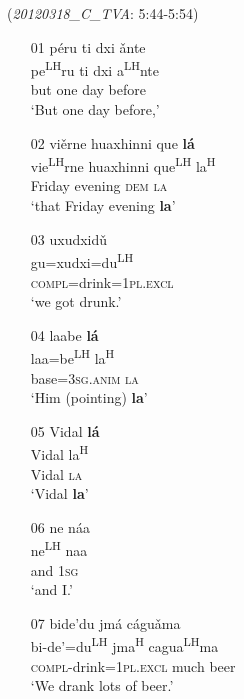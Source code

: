 \ea\label{list} (\textit{20120318{\_}C{\_}TVA}: 5:44-5:54)
\begin{itemize}
\item[01]
\glll p\'{e}ru ti dxi \v{a}nte \\
pe\textsuperscript{LH}ru ti dxi a\textsuperscript{LH}nte \\
but one day before \\
\glt  `But one day before,'


\item[02]
\glll vi\v{e}rne huaxhinni que \textbf{l\'{a}} \\
vie\textsuperscript{LH}rne huaxhinni que\textsuperscript{LH} la\textsuperscript{H} \\
Friday evening \textsc{dem} \textsc{la} \\
\glt  `that Friday evening \textbf{la}'


\item[03]
\glll uxudxid\v{u} \\
gu=xudxi=du\textsuperscript{LH} \\
\textsc{compl}=drink=1\textsc{pl.excl} \\
\glt  `we got drunk.'


\item[04]
\glll laabe \textbf{l\'{a}} \\
laa=be\textsuperscript{LH} la\textsuperscript{H} \\
base=3\textsc{sg.anim} \textsc{la} \\
\glt  `Him (pointing) \textbf{la}'


\item[05]
\glll Vidal \textbf{l\'{a}} \\
Vidal la\textsuperscript{H} \\
Vidal \textsc{la} \\
\glt  `Vidal \textbf{la}'


\item[06]
\glll ne n\'{a}a \\
ne\textsuperscript{LH} naa \\
and 1\textsc{sg} \\
\glt  `and I.'


\item[07]
\glll bide'du jm\'{a} c\'{a}gu\v{a}ma \\
bi-de'=du\textsuperscript{LH} jma\textsuperscript{H} cagua\textsuperscript{LH}ma \\
\textsc{compl}-drink=1\textsc{pl.excl} much beer \\
\glt  `We drank lots of beer.'  

\end{itemize}
